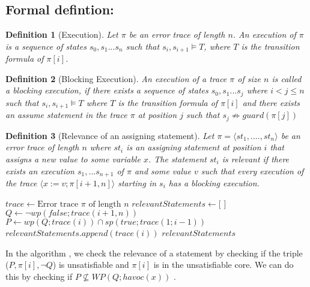 \documentclass{article}
\newcommand{\limp}{\Rightarrow}
\newtheorem{mydef}{Definition}
\begin{document}
\subsection{Formal defintion:}
\begin{mydef}[Execution]\label{mydef:execution}
Let $\pi$ be an error trace of length $n$. An execution of $\pi$ is a sequence of states $s_0, s_1 ... s_n$ such that $s_i, s_{i+1} \vDash T$, where $T$ is the transition formula of $\pi[i]$.
\end{mydef}
\begin{mydef}[Blocking Execution]\label{mydef:blocked_execution}
An execution of a trace $\pi$ of size $n$ is called a blocking execution, if there exists a sequence of states $s_0,s_1...s_j$ where $i<j \leq n$ such that $s_i, s_{i+1} \vDash T$ where $T$ is the transition formula of $\pi[i]$ and there exists an assume statement in the trace $\pi$ at position $j$ such that $s_j \not \limp guard(\pi[j])$
\end{mydef}

\begin{mydef}[Relevance of an assigning statement]\label{mydef:responsible}
Let $\pi = \langle st_1,....,st_n \rangle$ be an error trace of length $n$ where $st_i$ is an assigning statement at position $i$ that assigns a new value to some variable $x$. The statement $st_i$ is relevant if there exists an execution $s_1,...s_{n+1}$ of $\pi$ and some value $v$ such that every execution of the trace $\langle x:=v; \pi[i+1,n] \rangle$ starting in $s_i$ has a blocking execution.
\end{mydef}

\newpage
\begin{algorithm}
\caption{Relavance of an assigning statement}\label{relevance}
\begin{algorithmic}[1]
\State $trace \gets \text{Error trace } \pi \text{ of length } \textit{n}$
\State $relevantStatements \gets \text{[ ]}$
\State $Q \gets \neg wp(false;trace(i+1,n))$
\State $P \gets wp(Q; trace(i)) \cap sp(true; trace(1;i-1))$
\State $relevantStatements.append(trace(i))$
\EndIf
\EndFor
\Return $relevantStatements$
\EndProcedure
\end{algorithmic}
\end{algorithm}
In the algorithm , we check the relevance of a statement by checking if the triple ($P,\pi[i],\neg Q$) is unsatisfiable and $\pi[i]$ is in the unsatisfiable core. We can do this by checking if $P \not \subseteq WP(Q; havoc(x))$ .
\end{document}

